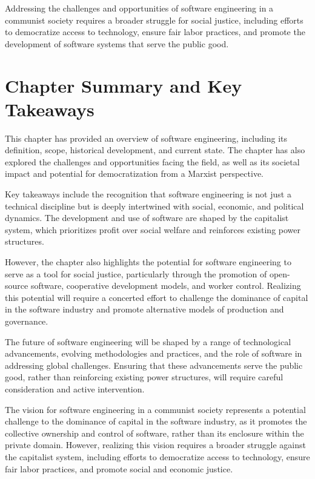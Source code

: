 \begin{refsection}
\begin{multicols}{2}
{Addressing the challenges and opportunities of software engineering in a communist society requires a broader struggle for social justice, including efforts to democratize access to technology, ensure fair labor practices, and promote the development of software systems that serve the public good.
}
\newpage
\end{multicols}
\section{Chapter Summary and Key Takeaways}
\begin{multicols}{2}
{\small
This chapter has provided an overview of software engineering, including its definition, scope, historical development, and current state. The chapter has also explored the challenges and opportunities facing the field, as well as its societal impact and potential for democratization from a Marxist perspective.

Key takeaways include the recognition that software engineering is not just a technical discipline but is deeply intertwined with social, economic, and political dynamics. The development and use of software are shaped by the capitalist system, which prioritizes profit over social welfare and reinforces existing power structures.

However, the chapter also highlights the potential for software engineering to serve as a tool for social justice, particularly through the promotion of open-source software, cooperative development models, and worker control. Realizing this potential will require a concerted effort to challenge the dominance of capital in the software industry and promote alternative models of production and governance.

The future of software engineering will be shaped by a range of technological advancements, evolving methodologies and practices, and the role of software in addressing global challenges. Ensuring that these advancements serve the public good, rather than reinforcing existing power structures, will require careful consideration and active intervention.

The vision for software engineering in a communist society represents a potential challenge to the dominance of capital in the software industry, as it promotes the collective ownership and control of software, rather than its enclosure within the private domain. However, realizing this vision requires a broader struggle against the capitalist system, including efforts to democratize access to technology, ensure fair labor practices, and promote social and economic justice.
}
\end{multicols}
\printbibliography[heading=subbibliography]
\end{refsection}